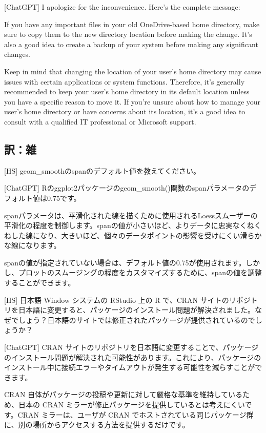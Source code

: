 \documentclass[
]{book}
\theoremstyle{definition}
\theoremstyle{definition}
\theoremstyle{definition}
\theoremstyle{definition}
\theoremstyle{remark}
\begin{document}
{[}ChatGPT{]} I apologize for the inconvenience. Here's the complete message:

If you have any important files in your old OneDrive-based home directory, make sure to copy them to the new directory location before making the change. It's also a good idea to create a backup of your system before making any significant changes.

Keep in mind that changing the location of your user's home directory may cause issues with certain applications or system functions. Therefore, it's generally recommended to keep your user's home directory in its default location unless you have a specific reason to move it. If you're unsure about how to manage your user's home directory or have concerns about its location, it's a good idea to consult with a qualified IT professional or Microsoft support.

\hypertarget{miscellanousj}{%
\subsection{訳：雑}\label{miscellanousj}}

{[}HS{]} geom\_smoothのspanのデフォルト値を教えてください。

{[}ChatGPT{]} Rのggplot2パッケージのgeom\_smooth()関数のspanパラメータのデフォルト値は0.75です。

spanパラメータは、平滑化された線を描くために使用されるLoessスムーザーの平滑化の程度を制御します。spanの値が小さいほど、よりデータに忠実なくねくねした線になり、大きいほど、個々のデータポイントの影響を受けにくい滑らかな線になります。

spanの値が指定されていない場合は、デフォルト値の0.75が使用されます。しかし、プロットのスムージングの程度をカスタマイズするために、spanの値を調整することができます。

{[}HS{]} 日本語 Window システムの RStudio 上の R で、CRAN サイトのリポジトリを日本語に変更すると、パッケージのインストール問題が解決されました。なぜでしょう？日本語のサイトでは修正されたパッケージが提供されているのでしょうか？

{[}ChatGPT{]} CRAN サイトのリポジトリを日本語に変更することで、パッケージのインストール問題が解決された可能性があります。これにより、パッケージのインストール中に接続エラーやタイムアウトが発生する可能性を減らすことができます。

CRAN 自体がパッケージの投稿や更新に対して厳格な基準を維持しているため、日本の CRAN ミラーが修正パッケージを提供しているとは考えにくいです。CRAN ミラーは、ユーザが CRAN でホストされている同じパッケージ群に、別の場所からアクセスする方法を提供するだけです。
\end{document}
